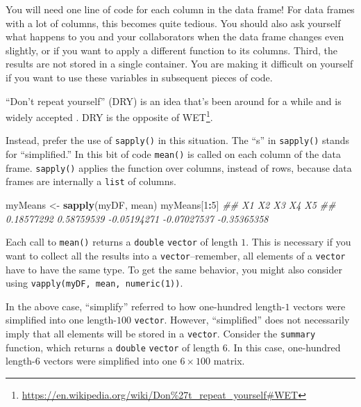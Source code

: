 \documentclass[12pt,krantz2]{krantz}
\makeatletter
\newenvironment{Shaded}{\begin{snugshade}}{\end{snugshade}}
\newcommand{\CommentTok}[1]{\textcolor[rgb]{0.37,0.37,0.37}{\textit{#1}}}
\newcommand{\DecValTok}[1]{\textcolor[rgb]{0.06,0.06,0.06}{#1}}
\newcommand{\KeywordTok}[1]{\textcolor[rgb]{0.27,0.27,0.27}{\textbf{#1}}}
\newcommand{\NormalTok}[1]{#1}
\newcommand{\OperatorTok}[1]{\textcolor[rgb]{0.43,0.43,0.43}{\textbf{#1}}}
\newcommand{\StringTok}[1]{\textcolor[rgb]{0.5,0.5,0.5}{#1}}
\renewcommand{\href}[2]{#2\footnote{\url{#1}}}
\newenvironment{kframe}{%
\medskip{}
\setlength{\fboxsep}{.8em}
 \def\at@end@of@kframe{}%
 \ifinner\ifhmode%
  \def\at@end@of@kframe{\end{minipage}}%
  \begin{minipage}{\columnwidth}%
 \fi\fi%
 \def\FrameCommand##1{\hskip\@totalleftmargin \hskip-\fboxsep
 \colorbox{shadecolor}{##1}\hskip-\fboxsep
     \hskip-\linewidth \hskip-\@totalleftmargin \hskip\columnwidth}%
 \MakeFramed {\advance\hsize-\width
   \@totalleftmargin\z@ \linewidth\hsize
   \@setminipage}}%
 {\par\unskip\endMakeFramed%
 \at@end@of@kframe}
\renewenvironment{Shaded}{\begin{kframe}}{\end{kframe}}
\makeatother
\begin{document}
You will need one line of code for each column in the data frame! For data frames with a lot of columns, this becomes quite tedious. You should also ask yourself what happens to you and your collaborators when the data frame changes even slightly, or if you want to apply a different function to its columns. Third, the results are not stored in a single container. You are making it difficult on yourself if you want to use these variables in subsequent pieces of code.

\begin{rmd-details}
``Don't repeat yourself'' (DRY) is an idea that's been around for a while and is widely accepted \citep{hunt2000pragmatic}. DRY is the opposite of \href{https://en.wikipedia.org/wiki/Don\%27t_repeat_yourself\#WET}{WET}.

\end{rmd-details}

Instead, prefer the use of \texttt{sapply()} in this situation. The ``s'' in \texttt{sapply()} stands for ``simplified.'' In this bit of code \texttt{mean()} is called on each column of the data frame. \texttt{sapply()} applies the function over columns, instead of rows, because data frames are internally a \texttt{list} of columns.

\begin{Shaded}
\begin{Highlighting}[]
\NormalTok{myMeans <-}\StringTok{ }\KeywordTok{sapply}\NormalTok{(myDF, mean)}
\NormalTok{myMeans[}\DecValTok{1}\OperatorTok{:}\DecValTok{5}\NormalTok{]}
\CommentTok{##          X1          X2          X3          X4          X5 }
\CommentTok{##  0.18577292  0.58759539 -0.05194271 -0.07027537 -0.35365358}
\end{Highlighting}
\end{Shaded}

Each call to \texttt{mean()} returns a \texttt{double} \texttt{vector} of length \(1\). This is necessary if you want to collect all the results into a \texttt{vector}--remember, all elements of a \texttt{vector} have to have the same type. To get the same behavior, you might also consider using \texttt{vapply(myDF,\ mean,\ numeric(1))}.

In the above case, ``simplify'' referred to how one-hundred length-\(1\) vectors were simplified into one length-\(100\) \texttt{vector}. However, ``simplified'' does not necessarily imply that all elements will be stored in a \texttt{vector}. Consider the \texttt{summary} function, which returns a \texttt{double} \texttt{vector} of length \(6\). In this case, one-hundred length-\(6\) vectors were simplified into one \(6 \times 100\) matrix.
\end{document}

